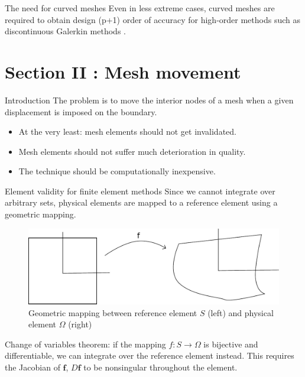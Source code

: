 \documentclass[t,12pt]{beamer}
\let\bld\boldsymbol
\begin{document}
\begin{frame}{The need for curved meshes}
Even in less extreme cases, curved meshes are required to obtain design (p+1) order of accuracy for high-order methods such as discontinuous Galerkin methods .
\end{frame}

\section{Section II : Mesh movement}

\begin{frame}{Introduction}
The problem is to move the interior nodes of a mesh when a given displacement is imposed on the boundary.
\begin{itemize}
	\item At the very least: mesh elements should not get invalidated.
	\item Mesh elements should not suffer much deterioration in quality.
	\item The technique should be computationally inexpensive.
\end{itemize}
\end{frame}

\begin{frame}{Element validity for finite element methods}
Since we cannot integrate over arbitrary sets, physical elements are mapped to a reference element using a geometric mapping.
\begin{figure}
	\includegraphics[scale=0.3]{geommapping}
	\caption{Geometric mapping between reference element $S$ (left) and physical element $\Omega$ (right)}
\end{figure}
Change of variables theorem: if the mapping $f:S\rightarrow\Omega$ is bijective and differentiable, we can integrate over the reference element instead. This requires the Jacobian of $\bld{f}$, $D\bld{f}$ to be nonsingular throughout the element.
\end{frame}
\end{document}
